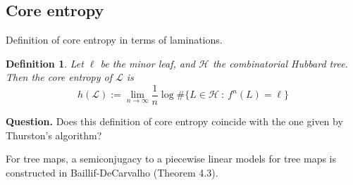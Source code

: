\documentclass[11pt]{amsart}
\newtheorem{lemma}[theorem]{Lemma}
\newtheorem{definition}[theorem]{Definition}
\begin{document}




\subsection{Core entropy}


Definition of core entropy in terms of laminations. 

\begin{definition}
Let $\ell$ be the minor leaf, and $\mathcal{H}$ the combinatorial Hubbard tree. 
Then the core entropy of $\mathcal{L}$ is 
$$h(\mathcal{L}) := \lim_{n \to \infty} \frac{1}{n} \log \# \{ L \in \mathcal{H} \ : \ f^n(L) = \ell \}$$
\end{definition}


\medskip
\noindent \textbf{Question.} Does this definition of core entropy coincide with the one given by Thurston's algorithm?


\medskip
For tree maps, a semiconjugacy to a piecewise linear models for tree maps is constructed in Baillif-DeCarvalho (Theorem 4.3). 
\end{document}
